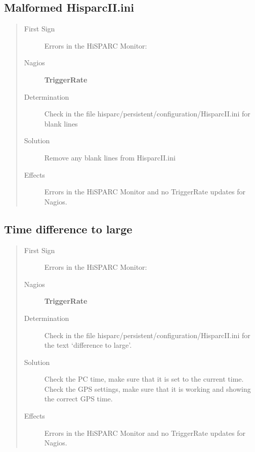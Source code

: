 \documentclass[a4paper,11pt,english]{sphinxmanual}
\begin{document}
\subsection{Malformed HisparcII.ini}
\label{known-issues:malformed-hisparcii-ini}\begin{quote}\begin{description}
\item[{First Sign}] \leavevmode
Errors in the HiSPARC Monitor: 

\item[{Nagios}] \leavevmode
\textbf{TriggerRate}

\item[{Determination}] \leavevmode
Check in the file hisparc/persistent/configuration/HisparcII.ini for blank lines

\item[{Solution}] \leavevmode
Remove any blank lines from HisparcII.ini

\item[{Effects}] \leavevmode
Errors in the HiSPARC Monitor and no TriggerRate updates for Nagios.

\end{description}\end{quote}


\subsection{Time difference to large}
\label{known-issues:time-difference-to-large}\begin{quote}\begin{description}
\item[{First Sign}] \leavevmode
Errors in the HiSPARC Monitor: 

\item[{Nagios}] \leavevmode
\textbf{TriggerRate}

\item[{Determination}] \leavevmode
Check in the file hisparc/persistent/configuration/HisparcII.ini for the text `difference to large'.

\item[{Solution}] \leavevmode
Check the PC time, make sure that it is set to the current time. Check the GPS settings, make sure that it is working and showing the correct GPS time.

\item[{Effects}] \leavevmode
Errors in the HiSPARC Monitor and no TriggerRate updates for Nagios.

\end{description}\end{quote}
\end{document}
